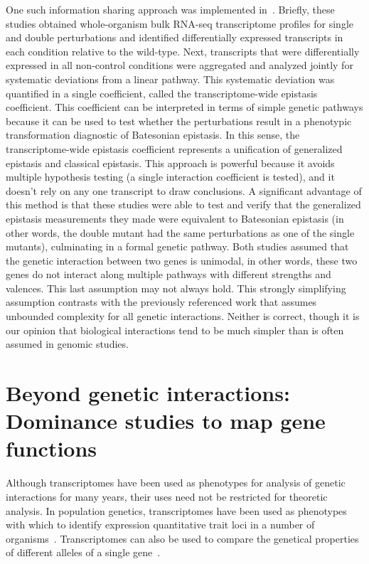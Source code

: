 One such information sharing approach was implemented
in~\citet{Angeles-Albores2018,Angeles-Albores2017}. Briefly, these studies
obtained whole-organism bulk RNA-seq transcriptome profiles for single and
double perturbations and identified differentially expressed transcripts in each
condition relative to the wild-type. Next, transcripts that were differentially
expressed in all non-control conditions were aggregated and analyzed jointly for
systematic deviations from a linear pathway. This systematic deviation was
quantified in a single coefficient, called the transcriptome-wide epistasis
coefficient. This coefficient can be interpreted in terms of simple genetic
pathways because it can be used to test whether the perturbations result in a
phenotypic transformation diagnostic of Batesonian epistasis. In this sense, the
transcriptome-wide epistasis coefficient represents a unification of generalized
epistasis and classical epistasis. This approach is powerful because it avoids
multiple hypothesis testing (a single interaction coefficient is tested), and it
doesn't rely on any one transcript to draw conclusions. A significant advantage
of this method is that these studies were able to test and verify that the
generalized epistasis measurements they made were equivalent to Batesonian
epistasis (in other words, the double mutant had the same perturbations as one
of the single mutants), culminating in a formal genetic pathway. Both studies
assumed that the genetic interaction between two genes is unimodal, in other
words, these two genes do not interact along multiple pathways with different
strengths and valences. This last assumption may not always hold. This strongly
simplifying assumption contrasts with the previously referenced work that
assumes unbounded complexity for all genetic interactions. Neither is correct,
though it is our opinion that biological interactions tend to be much simpler
than is often assumed in genomic studies.

\section*{Beyond genetic interactions: Dominance studies to map gene
          functions}\label{sec:dominance_rev}
Although transcriptomes have been used as phenotypes for analysis of genetic
interactions for many years, their uses need not be restricted for theoretic
analysis. In population genetics, transcriptomes have been used as phenotypes
with which to identify expression quantitative trait loci in a number of
organisms~\citep{Brem2002,DeCook2006,Kirst2004,Schadt2003}. Transcriptomes can
also be used to compare the genetical properties of different alleles of a
single gene~\citep{Angeles-Albores2018b}.

